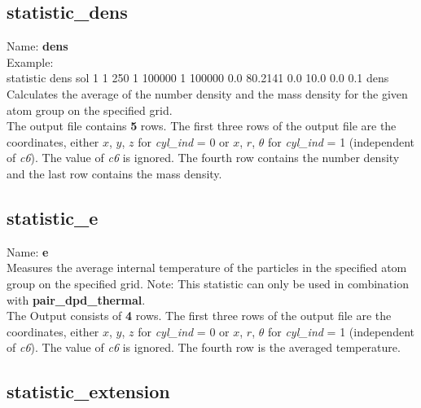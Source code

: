 \documentclass[a4paper,10pt]{scrreprt}
\begin{document}
\subsection{statistic\_dens}

Name: {\bfseries dens}
\\[2ex]
Example:\\[0.5ex]
statistic       dens sol 1 1 250 1 100000 1 100000 0.0 80.2141 0.0 10.0 0.0 0.1 dens
\\[2ex]
Calculates the average of the number density and the mass density for the given atom group on the specified grid.
\\[2ex]
The output file contains {\bfseries 5} rows.
The first three rows of the output file are the coordinates, either $x$, $y$, $z$ for \textit{cyl\_ind} = 0 or $x$, $r$, $\theta$ for \textit{cyl\_ind} = 1 (independent of \textit{c6}).
The value of \textit{c6} is ignored.
The fourth row contains the number density and the last row contains the mass density.


\subsection{statistic\_e}

Name: {\bfseries e}
\\[2ex]
Measures the average internal temperature of the particles in the specified atom group on the specified grid.
Note: This statistic can only be used in combination with \textbf{pair\_dpd\_thermal}.
\\[2ex]
The Output consists of {\bfseries 4} rows.
The first three rows of the output file are the coordinates, either $x$, $y$, $z$ for \textit{cyl\_ind} = 0 or $x$, $r$, $\theta$ for \textit{cyl\_ind} = 1 (independent of \textit{c6}).
The value of \textit{c6} is ignored.
The fourth row is the averaged temperature. 


\subsection{statistic\_extension}
\end{document}
